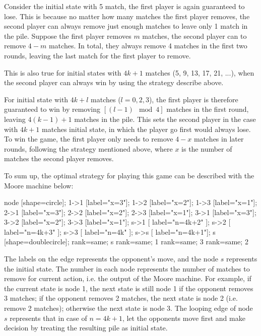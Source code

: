\documentclass{article}
\begin{document}
Consider the initial state with 5 match, the first player is again guaranteed to lose. This is because no matter how many matches the first player removes, the second player can always remove just enough matches to leave only 1 match in the pile. Suppose the first player removes $m$ matches, the second player can to remove $4-m$ matches. In total, they always remove 4 matches in the first two rounds, leaving the last match for the first player to remove.

This is also true for initial states with $4k+1$ matches (5, 9, 13, 17, 21, ...), when the second player can always win by using the strategy describe above. 

For initial state with $4k + l$ matches ($l=0, 2, 3$), the first player is therefore guaranteed to win by removing $[(l-1)\mod 4]$ matches in the first round, leaving $4(k-1)+1$ matches in the pile. This sets the second player in the case with $4k+1$ matches initial state, in which the player go first would always lose. To win the game, the first player only needs to remove $4-x$ matches in later rounds, following the strategy mentioned above, where $x$ is the number of matches the second player removes.

To sum up, the optimal strategy for playing this game can be described with the Moore machine below:

\begin{center}
 {
    node [shape=circle];
	1->1 [label="x=3"];
	1->2 [label="x=2"];
	1->3 [label="x=1"];
	2->1 [label="x=3"];
	2->2 [label="x=2"];
	2->3 [label="x=1"];
	3->1 [label="x=3"];
	3->2 [label="x=2"];
	3->3 [label="x=1"];
	s->1 [ label="n=4k+2" ];
	s->2 [ label="n=4k+3" ];
	s->3 [ label="n=4k" ];
	s->s [ label="n=4k+1"];
	s [shape=doublecircle];
	{rank=same; s}
	{rank=same; 1}
	{rank=same; 3}
	{rank=same; 2}
}
\end{center}
The labels on the edge represents the opponent's move, and the node $s$ represents the initial state. The number in each node represents the number of matches to remove for current action, i.e. the output of the Moore machine. For example, if the current state is node 1, the next state is still node 1 if the opponent removes 3 matches; if the opponent removes 2 matches, the next state is node 2 (i.e. remove 2 matches); otherwise the next state is node 3. The looping edge of node $s$ represents that in case of $n=4k+1$, let the opponents move first and make decision by treating the resulting pile as initial state.
\end{document}
